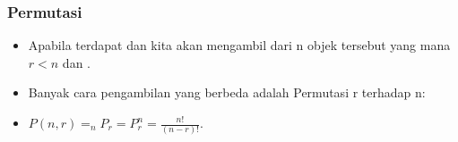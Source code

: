 \begin{frame}
\frametitle{Permutasi}
\begin{itemize}
  \item Apabila terdapat  dan kita akan mengambil  dari n objek tersebut yang mana $r<n$ dan .
  \item Banyak cara pengambilan yang berbeda adalah Permutasi r terhadap n: 
  \item $P(n,r) = _{n}P_{r} = P^{n}_{r} = \frac{n!}{(n-r)!}$.
\end{itemize}
\end{frame}
%
%
